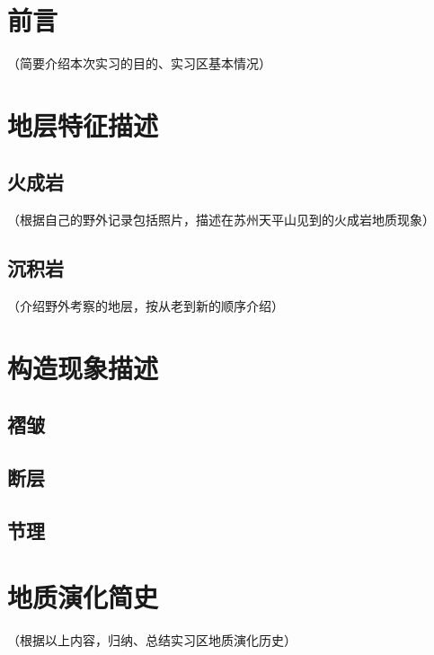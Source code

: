 \documentclass{fieldpractice-geo}
\begin{document}
\section{前言}
（简要介绍本次实习的目的、实习区基本情况）

\section{地层特征描述}
\subsection{火成岩}
（根据自己的野外记录包括照片，描述在苏州天平山见到的火成岩地质现象）
\subsection{沉积岩}
（介绍野外考察的地层，按从老到新的顺序介绍）
\subsubsection{}

\section{构造现象描述}
\subsection{褶皱}

\subsection{断层}

\subsection{节理}

\section{地质演化简史}
（根据以上内容，归纳、总结实习区地质演化历史）

\geobibstyle

\end{document}

